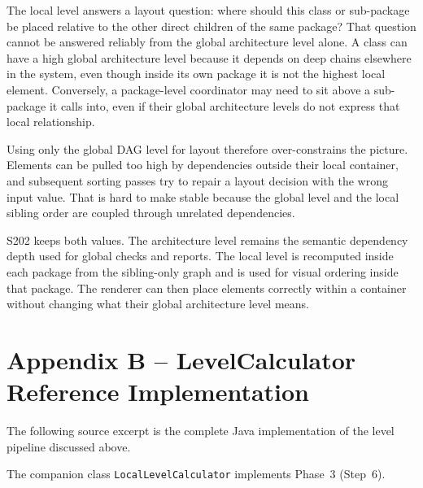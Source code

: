 \documentclass[a4paper,twoside]{article}
\begin{document}
The local level answers a layout question: where should this class or
sub-package be placed relative to the other direct children of the same package?
That question cannot be answered reliably from the global architecture level
alone. A class can have a high global architecture level because it depends on
deep chains elsewhere in the system, even though inside its own package it is
not the highest local element. Conversely, a package-level coordinator may need
to sit above a sub-package it calls into, even if their global architecture
levels do not express that local relationship.

Using only the global DAG level for layout therefore over-constrains the
picture. Elements can be pulled too high by dependencies outside their local
container, and subsequent sorting passes try to repair a layout decision with
the wrong input value. That is hard to make stable because the global level and
the local sibling order are coupled through unrelated dependencies.

S202 keeps both values. The architecture level remains the semantic dependency
depth used for global checks and reports. The local level is recomputed
inside each package from the sibling-only graph and is used for visual ordering
inside that package. The renderer can then place elements correctly within a
container without changing what their global architecture level means.


\clearpage

\section*{Appendix B -- LevelCalculator Reference Implementation}

The following source excerpt is the complete Java implementation of the level
pipeline discussed above.



\vspace{1em}
The companion class \texttt{LocalLevelCalculator} implements Phase~3 (Step~6).


\end{document}
